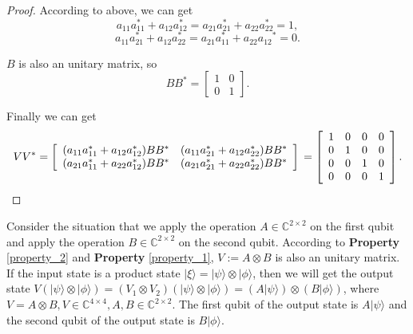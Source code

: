 \begin{proof}
According to above, we can get
\begin{equation}
    a_{11} a_{11}^*+a_{12} a_{12}^*=a_{21} a_{21}^*+a_{22} a_{22}^*=1,
\end{equation}
\begin{equation}
    a_{11} a_{21}^*+a_{12} a_{22}^*=a_{21}a_{11}^*+a_{22} a_{12}{ }^*=0 .
\end{equation}

$B$ is also an unitary matrix, so 
\begin{equation}
    B B^*=\left[\begin{array}{ll}
1 & 0 \\
0 & 1
\end{array}\right].
\end{equation}

Finally we can get 
\begin{equation}
    V V^*=\left[\begin{array}{ll}
(a_{11} a_{11}^*+a_{12} a_{12}^*)B B^* & (a_{11} a_{21}^*+a_{12} a_{22}^*)B B^* \\
(a_{21} a_{11}^*+a_{22} a_{12}^*)B B^* & (a_{21} a_{21}^* +a_{22} a_{22}^*)B B^*
\end{array}\right]\\
=\left[\begin{array}{cccc}
1 & 0 & 0 & 0 \\
0 & 1 & 0 & 0 \\
0 & 0 & 1 & 0 \\
0 & 0 & 0 & 1 \\
\end{array}\right].
\end{equation}

\end{proof}

Consider the situation that we apply the operation $A\in\mathbb{C}^{2\times2}$ on the first qubit and apply the operation $B\in\mathbb{C}^{2\times2}$ on the second qubit. According to \textbf{Property} \ref{property_2} and \textbf{Property} \ref{property_1}, $V:=A\otimes B$ is also an unitary matrix. If the input state is a product state $|\xi\rangle=|\psi\rangle\otimes|\phi\rangle$, then we will get the output state $V(|\psi\rangle\otimes|\phi\rangle)=(V_1\otimes V_2)(|\psi\rangle\otimes|\phi\rangle)=(A|\psi\rangle)\otimes(B|\phi\rangle)$, where $V=A\otimes B, V\in \mathbb{C}^{4\times4}, A, B\in \mathbb{C}^{2\times2}$. The first qubit of the output state is $A|\psi\rangle$ and the second qubit of the output state is $B|\phi\rangle$.
\vspace{0.5cm}

